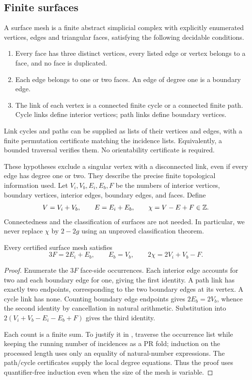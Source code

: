 \subsection{Finite surfaces}

\begin{definition}\label{def:mesh}
A surface mesh is a finite abstract simplicial complex with explicitly enumerated vertices, edges and triangular faces, satisfying the following decidable conditions.
\begin{enumerate}
\item Every face has three distinct vertices, every listed edge or vertex belongs to a face, and no face is duplicated.
\item Each edge belongs to one or two faces. An edge of degree one is a boundary edge.
\item The link of each vertex is a connected finite cycle or a connected finite path. Cycle links define interior vertices; path links define boundary vertices.
\end{enumerate}
Link cycles and paths can be supplied as lists of their vertices and edges, with a finite permutation certificate matching the incidence lists. Equivalently, a bounded traversal verifies them. No orientability certificate is required.
\end{definition}

These hypotheses exclude a singular vertex with a disconnected link, even if every edge has degree one or two. They describe the precise finite topological information used. Let $V_i,V_b,E_i,E_b,F$ be the numbers of interior vertices, boundary vertices, interior edges, boundary edges, and faces. Define
\[
V=V_i+V_b,\qquad E=E_i+E_b,\qquad\chi=V-E+F\in\mathbb Z.
\]
Connectedness and the classification of surfaces are not needed. In particular, we never replace $\chi$ by $2-2g$ using an unproved classification theorem.

\begin{lemma}\label{lem:incidence}
Every certified surface mesh satisfies
\begin{equation}\label{eq:incidence}
3F=2E_i+E_b,\qquad E_b=V_b,
\qquad 2\chi=2V_i+V_b-F.
\end{equation}
\end{lemma}
\begin{proof}
Enumerate the $3F$ face-side occurrences. Each interior edge accounts for two and each boundary edge for one, giving the first identity. A path link has exactly two endpoints, corresponding to the two boundary edges at its vertex. A cycle link has none. Counting boundary edge endpoints gives $2E_b=2V_b$, whence the second identity by cancellation in natural arithmetic. Substitution into $2(V_i+V_b-E_i-E_b+F)$ gives the third identity.

Each count is a finite sum. To justify it in \ipra, traverse the occurrence list while keeping the running number of incidences as a PR fold; induction on the processed length uses only an equality of natural-number expressions. The path/cycle certificates supply the local degree equations. Thus the proof uses quantifier-free induction even when the size of the mesh is variable.
\end{proof}

